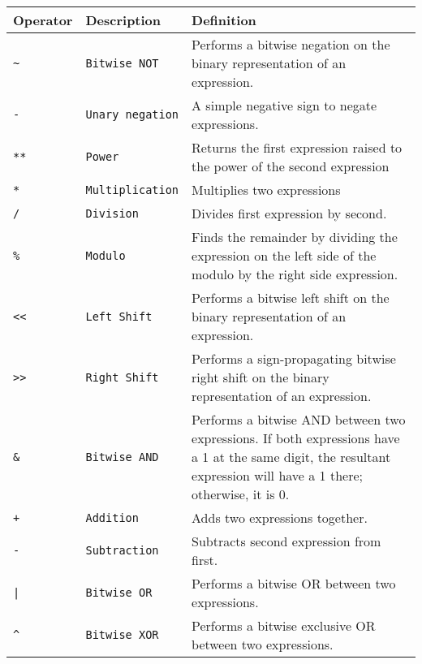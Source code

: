 			\begin{table}[H]
			\begin{tabular}{ |p{2cm}|p{3cm}|p{8cm}|  }
			\hline
			\textbf{Operator} & \textbf{Description} & \textbf{Definition} \\ \hline
			\rule{0pt}{3ex}\texttt{\~} & \texttt{Bitwise NOT } & {Performs a bitwise negation on the binary representation of an expression.} \\
			\rule{0pt}{3ex}\texttt{-} & \texttt{Unary negation} & {A simple negative sign to negate expressions.} \\ \hline
			\rule{0pt}{3ex}\texttt{**} & \texttt{Power} & {Returns the first expression raised to the power of the second expression} \\ \hline
			\texttt{*} & \texttt{Multiplication} & {Multiplies two expressions} \\
			\rule{0pt}{3ex}\texttt{/} & \texttt{Division} & {Divides first expression by second}. \\
			\rule{0pt}{3ex}\texttt{\%} & \texttt{Modulo} & {Finds the remainder by dividing the expression on the left side of the modulo by the right side expression.} \\
			\rule{0pt}{3ex}\texttt{<<} & \texttt{Left Shift} & {Performs a bitwise left shift on the binary representation of an expression.} \\
			\rule{0pt}{3ex}\texttt{>>} & \texttt{Right Shift} & {Performs a sign-propagating bitwise right shift on the binary representation of an expression.} \\
			\rule{0pt}{3ex}\texttt{\&} & \texttt{Bitwise AND} & {Performs a bitwise AND between two expressions. If both expressions have a 1 at the same digit, the resultant expression will have a 1 there; otherwise, it is 0.} \\ \hline
			\rule{0pt}{3ex}\texttt{+} & \texttt{Addition} & {Adds two expressions together.} \\
			\rule{0pt}{3ex}\texttt{-} & \texttt{Subtraction} & {Subtracts second expression from first.} \\
			\rule{0pt}{3ex}\texttt{|} & \texttt{Bitwise OR} & {Performs a bitwise OR between two expressions.} \\
			\rule{0pt}{3ex}\texttt{\^} & \texttt{Bitwise XOR} & {Performs a bitwise exclusive OR between two expressions.} \\ \hline
			\end{tabular}
			\end{table}
